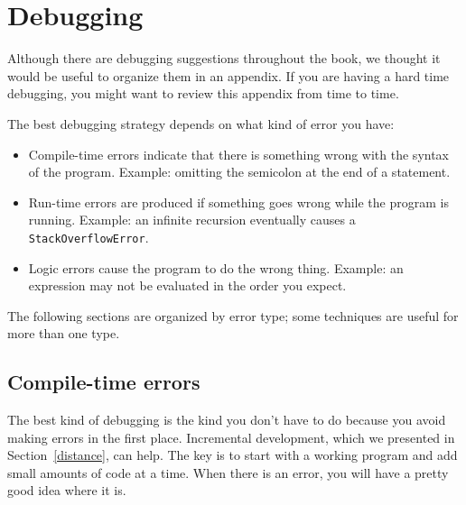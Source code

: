 \documentclass[12pt]{book}
\theoremstyle{exercise}
\newcommand{\java}[1]{\verb"#1"}
\begin{document}
\chapter{Debugging}
\label{debugappendix}


Although there are debugging suggestions throughout the book, we thought it would be useful to organize them in an appendix.
If you are having a hard time debugging, you might want to review this appendix from time to time.

The best debugging strategy depends on what kind of error you have:

\begin{itemize}

\item Compile-time errors indicate that there is something wrong with the syntax of the program.
Example: omitting the semicolon at the end of a statement.


\item Run-time errors are produced if something goes wrong while the program is running.
Example: an infinite recursion eventually causes a \java{StackOverflowError}.


\item Logic errors cause the program to do the wrong thing.
Example: an expression may not be evaluated in the order you expect.


\end{itemize}


The following sections are organized by error type; some techniques are useful for more than one type.


\section{Compile-time errors}

The best kind of debugging is the kind you don't have to do because you avoid making errors in the first place.
Incremental development, which we presented in Section~\ref{distance}, can help.
The key is to start with a working program and add small amounts of code at a time.
When there is an error, you will have a pretty good idea where it is.
\end{document}

